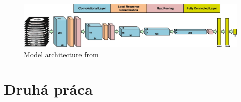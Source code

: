 \begin{figure}[h]
\begin{centering}
\includegraphics[width=16cm]{assets/images/RW1-net-arch.png}
\par\end{centering}
\caption{Model architecture from \cite{relatedWork1} \label{fig:rw1}}
\end{figure}


\section{Druhá práca}
\lipsum
